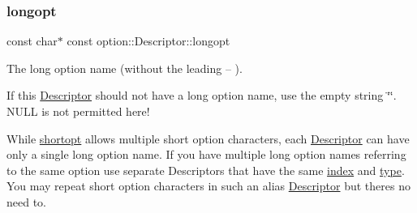 \subsubsection{\texorpdfstring{longopt}{longopt}}
{\footnotesize\ttfamily const char$\ast$ const option\+::\+Descriptor\+::longopt}



The long option name (without the leading {\ttfamily --} ). 

If this \hyperlink{structoption_1_1_descriptor}{Descriptor} should not have a long option name, use the empty string \char`\"{}\char`\"{}. N\+U\+LL is not permitted here!

While \hyperlink{structoption_1_1_descriptor_a0dba4ccca59c19d6ed4081391fca5adb}{shortopt} allows multiple short option characters, each \hyperlink{structoption_1_1_descriptor}{Descriptor} can have only a single long option name. If you have multiple long option names referring to the same option use separate Descriptors that have the same \hyperlink{structoption_1_1_descriptor_a1fee8ac44f529c99ac2b1149b4c391b1}{index} and \hyperlink{structoption_1_1_descriptor_a1b220dabd8aad075fa441a80f9b9343c}{type}. You may repeat short option characters in such an alias \hyperlink{structoption_1_1_descriptor}{Descriptor} but there\textquotesingle{}s no need to.

